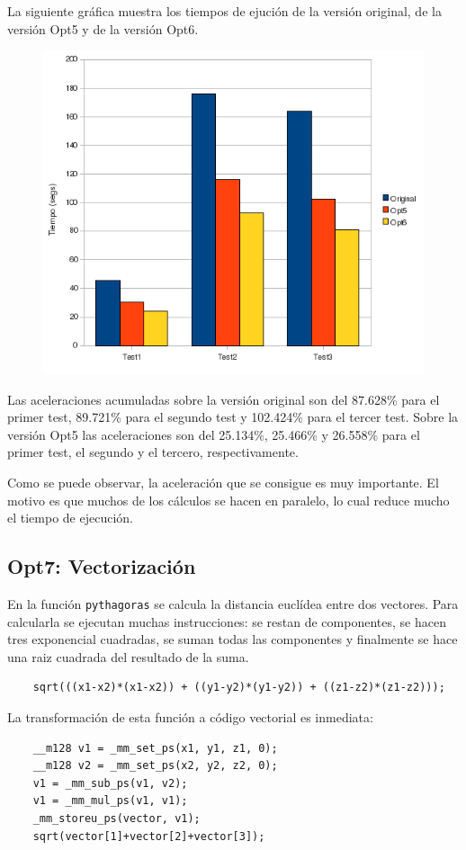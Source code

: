 La siguiente gr\'{a}fica muestra los tiempos de ejuci\'{o}n de la versi\'{o}n
original, de la versi\'{o}n Opt5 y de la versi\'{o}n Opt6.

\begin{figure}[ht]
   \centering
   \includegraphics[keepaspectratio=true,width=.5\textwidth]{figures/opt6-perf}
\end{figure}

Las aceleraciones acumuladas sobre la versi\'{o}n original son del 87.628\% para el
primer test, 89.721\% para el segundo test y 102.424\% para el tercer test. Sobre
la versi\'{o}n Opt5 las aceleraciones son del 25.134\%, 25.466\% y 26.558\% para el
primer test, el segundo y el tercero, respectivamente.

Como se puede observar, la aceleraci\'{o}n que se consigue es muy importante. El
motivo es que muchos de los c\'{a}lculos se hacen en paralelo, lo cual reduce
mucho el tiempo de ejecuci\'{o}n.

\subsection{Opt7: Vectorizaci\'{o}n}

En la funci\'{o}n \texttt{pythagoras} se calcula la distancia eucl\'{i}dea
entre dos vectores. Para calcularla se ejecutan muchas instrucciones: se restan
de componentes, se hacen tres exponencial cuadradas, se suman todas las
componentes y finalmente se hace una raiz cuadrada del resultado de la suma.

\begin{lstlisting}
    sqrt(((x1-x2)*(x1-x2)) + ((y1-y2)*(y1-y2)) + ((z1-z2)*(z1-z2)));
\end{lstlisting}

La transformaci\'{o}n de esta funci\'{o}n a c\'{o}digo vectorial es inmediata:

\begin{lstlisting}
    __m128 v1 = _mm_set_ps(x1, y1, z1, 0);
    __m128 v2 = _mm_set_ps(x2, y2, z2, 0);
    v1 = _mm_sub_ps(v1, v2);
    v1 = _mm_mul_ps(v1, v1);
    _mm_storeu_ps(vector, v1);
    sqrt(vector[1]+vector[2]+vector[3]);
\end{lstlisting}

